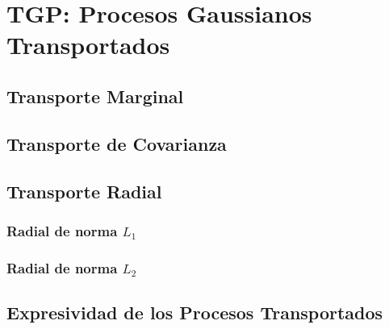 

\chapter{TGP: Procesos Gaussianos Transportados}
\section{Transporte Marginal}
\section{Transporte de Covarianza}
\section{Transporte Radial}
\subsection{Radial de norma $L_1$}
\subsection{Radial de norma $L_2$}
\section{Expresividad de los Procesos Transportados}
